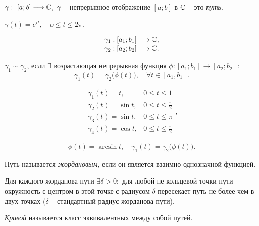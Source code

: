\begin{definition}[Путь]
    $ \gamma: \ [a;b] \longrightarrow \Comp, \ \gamma $ -- непрерывное отображение $ [a;b] $ в $ \mathbb{C} $ -- это \emph{путь}.
\end{definition}

\begin{example}
    $ \gamma(t) = e^{it}, \quad o \leqslant t \leqslant 2\pi $.
\end{example}

\begin{definition}
    \[
        \begin{array}{l}
            \gamma_1 : [a_1;b_1]\longrightarrow \mathbb{C}, \\
            \gamma_2 : [a_2;b_2]\longrightarrow \mathbb{C}.
        \end{array}
    \]

    $ \gamma_1 \sim  \gamma_2 $, если $ \exists $ возрастающая непрерывная функция $ \phi: [a_1;b_1] \longrightarrow [a_2;b_2] :  $
    \[
        \gamma_1(t) = \gamma_2\bigl(\phi(t)\bigr), \quad \forall t \in [a_1,b_1].
    \]
\end{definition}

\begin{example}
    \[
        \begin{array}{ll}
            \gamma_1(t) = t,      & 0 \leqslant t \leqslant 1             \\
            \gamma_2(t) = \sin t, & 0 \leqslant t \leqslant \frac{\pi}{2} \\
            \gamma_3(t) = \sin t, & 0 \leqslant t \leqslant \pi           \\
            \gamma_4(t) = \cos t, & 0 \leqslant t \leqslant \frac{\pi}{2}
        \end{array},
    \]

    \[
        \phi(t) = \arcsin t, \quad \gamma_1(t) = \gamma_2\big(\phi(t)\big).
    \]
\end{example}

\begin{definition}
   Путь называется \emph{жордановым}, если он является взаимно однозначной функцией.
\end{definition}

\begin{lemma}
    Для каждого жорданова пути $ \exists \delta > 0 : $ для любой не кольцевой точки пути окружность с центром в этой точке с радиусом $ \delta $ пересекает путь не более чем в двух точках ($ \delta $ -- стандартный радиус жорданова пути).
\end{lemma}

\begin{definition}[Кривая]
    \emph{Кривой} называется класс эквивалентных между собой путей.
\end{definition}